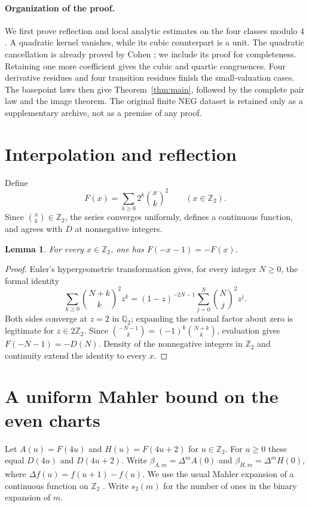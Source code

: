 \documentclass[11pt]{article}
\newtheorem{lemma}[theorem]{Lemma}
\theoremstyle{remark}\newtheorem{remark}[theorem]{Remark}
\newcommand{\Ztwo}{\mathbb Z_2}\newcommand{\Qtwo}{\mathbb Q_2}
\begin{document}
\paragraph{Organization of the proof.}
We first prove reflection and local analytic estimates on the four
classes modulo $4$. A quadratic kernel vanishes, while its cubic
counterpart is a unit. The quadratic cancellation is already proved by
Cohen \cite[Lemma~3]{Cohen1999}; we include its proof for completeness.
Retaining one more coefficient gives the
cubic and quartic congruences. Four derivative residues and four
transition residues finish the small-valuation cases. The basepoint
laws then give Theorem~\ref{thm:main}, followed by the complete pair
law and the image theorem. The original finite NEG dataset is retained
only as a supplementary archive, not as a premise of any proof.

\section{Interpolation and reflection}
Define
\[
F(x)=\sum_{k\ge0}2^k\binom{x}{k}^2\qquad(x\in\Ztwo).
\]
Since $\binom{x}{k}\in\Ztwo$, the series converges uniformly,
defines a continuous function, and agrees with $D$ at nonnegative integers.
\begin{lemma}\label{lem:reflection}
For every $x\in\Ztwo$, one has $F(-x-1)=-F(x)$.
\end{lemma}
\begin{proof}
Euler's hypergeometric transformation gives, for every integer $N\ge0$,
the formal identity
\[
\sum_{k\ge0}\binom{N+k}{k}^2z^k
=(1-z)^{-2N-1}\sum_{j=0}^N\binom Nj^2z^j.
\]
Both sides converge at $z=2$ in $\Qtwo$; expanding the rational factor
about zero is legitimate for $z\in2\Ztwo$. Since
$\binom{-N-1}{k}=(-1)^k\binom{N+k}{k}$, evaluation gives
$F(-N-1)=-D(N)$. Density of the nonnegative integers in $\Ztwo$
and continuity extend the identity to every $x$.
\end{proof}

\section{A uniform Mahler bound on the even charts}
Let $A(u)=F(4u)$ and $H(u)=F(4u+2)$ for $u\in\Ztwo$.
For $u\ge0$ these equal $D(4u)$ and $D(4u+2)$.
Write $\beta_{A,m}=\Delta^m A(0)$ and
$\beta_{H,m}=\Delta^m H(0)$, where $\Delta f(u)=f(u+1)-f(u)$.
We use the usual Mahler expansion of a continuous function on $\Ztwo$
\cite{Mahler1958,Robert2000}. Write $s_2(m)$ for the number of ones
in the binary expansion of $m$.
\end{document}
